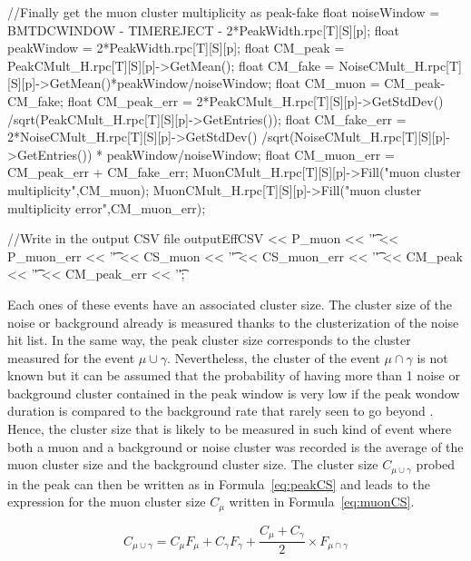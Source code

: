 \begin{code}
\begin{cppcode}
{    //Finally get the muon cluster multiplicity as peak-fake
    float noiseWindow = BMTDCWINDOW - TIMEREJECT - 2*PeakWidth.rpc[T][S][p];
    float peakWindow = 2*PeakWidth.rpc[T][S][p];
    float CM_peak = PeakCMult_H.rpc[T][S][p]->GetMean();
    float CM_fake = NoiseCMult_H.rpc[T][S][p]->GetMean()*peakWindow/noiseWindow;
    float CM_muon = CM_peak-CM_fake;
    float CM_peak_err = 2*PeakCMult_H.rpc[T][S][p]->GetStdDev()
                        /sqrt(PeakCMult_H.rpc[T][S][p]->GetEntries());
    float CM_fake_err = 2*NoiseCMult_H.rpc[T][S][p]->GetStdDev()
                        /sqrt(NoiseCMult_H.rpc[T][S][p]->GetEntries())
                        * peakWindow/noiseWindow;
    float CM_muon_err = CM_peak_err + CM_fake_err;
    MuonCMult_H.rpc[T][S][p]->Fill("muon cluster multiplicity",CM_muon);
    MuonCMult_H.rpc[T][S][p]->Fill("muon cluster multiplicity error",CM_muon_err);

    //Write in the output CSV file
    outputEffCSV << P_muon << '\t' << P_muon_err << '\t'
                 << CS_muon << '\t' << CS_muon_err << '\t'
                 << CM_peak << '\t' << CM_peak_err << '\t';
}
	\end{cppcode}
	\label{cpp:effcorr}
	\vspace{5mm}
	\end{code}
	
	Each ones of these events have an associated cluster size. The cluster size of the noise or background already is measured thanks to the clusterization of the noise hit list. In the same way, the peak cluster size corresponds to the cluster measured for the event $\mu\cup\gamma$. Nevertheless, the cluster of the event $\mu\cap\gamma$ is not known but it can be assumed that the probability of having more than 1 noise or background cluster contained in the peak window is very low if the peak wondow duration is compared to the background rate that rarely seen to go beyond . Hence, the cluster size that is likely to be measured in such kind of event where both a muon and a background or noise cluster was recorded is the average of the muon cluster size and the background cluster size. The cluster size $C_{\mu\cup\gamma}$ probed in the peak can then be written as in Formula~\ref{eq:peakCS} and leads to the expression for the muon cluster size $C_{\mu}$ written in Formula~\ref{eq:muonCS}.
	
	\begin{equation}
	\label{eq:peakCS}
	C_{\mu\cup\gamma} = C_{\mu}F_{\mu} + C_{\gamma}F_{\gamma} + \frac{C_{\mu}+C_{\gamma}}{2} \times F_{\mu\cap\gamma}
	\end{equation}
	
